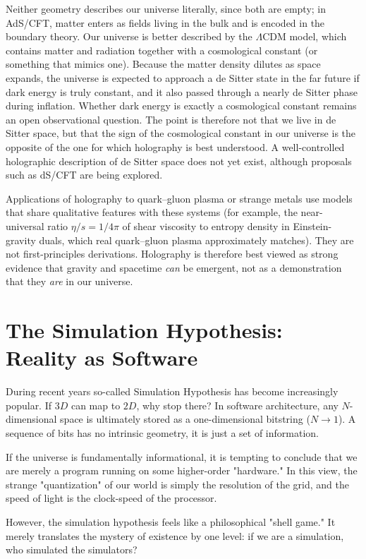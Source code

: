 Neither geometry describes our universe literally, since both are empty; in
AdS/CFT, matter enters as fields living in the bulk and is encoded in the
boundary theory. Our universe is better described by the $\Lambda$CDM model,
which contains matter and radiation together with a cosmological constant (or
something that mimics one). Because the matter density dilutes as space
expands, the universe is expected to approach a de Sitter state in the far
future if dark energy is truly constant, and it also passed through a nearly
de Sitter phase during inflation. Whether dark energy is exactly a cosmological
constant remains an open observational question. The point is therefore not
that we live in de Sitter space, but that the sign of the cosmological
constant in our universe is the opposite of the one for which holography is
best understood. A well-controlled holographic description of de Sitter space
does not yet exist, although proposals such as dS/CFT are being explored.

Applications of holography to quark--gluon plasma or strange metals use models
that share qualitative features with these systems (for example, the
near-universal ratio $\eta/s = 1/4\pi$ of shear viscosity to entropy density in
Einstein-gravity duals, which real quark--gluon plasma approximately matches).
They are not first-principles derivations. Holography is therefore best viewed
as strong evidence that gravity and spacetime \emph{can} be emergent, not as a
demonstration that they \emph{are} in our universe.


\section{The Simulation Hypothesis: Reality as Software}

During recent years so-called Simulation Hypothesis has become increasingly popular. If $3D$ can map to $2D$, why stop there? In software architecture, 
any $N$-dimensional space is ultimately stored as a one-dimensional bitstring ($N \rightarrow 1$). A sequence of bits has no intrinsic geometry, it is just a set of information.

If the universe is fundamentally informational, it is tempting to conclude that we are merely a program running on some higher-order "hardware." 
In this view, the strange "quantization" of our world is simply the resolution of the grid, and the speed of light is the clock-speed of the processor.

However, the simulation hypothesis feels like a philosophical "shell game." It merely translates the mystery of existence by one level: if we are a simulation, who simulated the simulators? 

